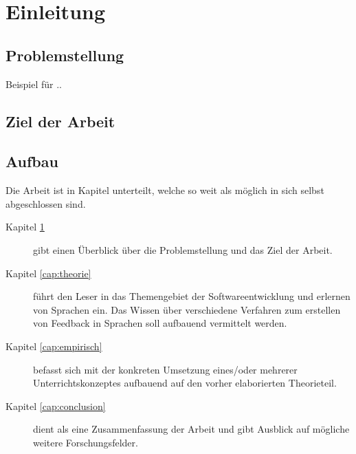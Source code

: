 \chapter{Einleitung}
\label{cap:einleitung}



\section{Problemstellung}

Beispiel für \cite{Akgun07}.. 

\lipsum[2-4]

\section{Ziel der Arbeit}
\lipsum[2-4]




\section{Aufbau}
Die Arbeit ist in Kapitel unterteilt, welche so weit als möglich in sich selbst abgeschlossen sind. 

\begin{description}
\item[Kapitel \ref{cap:einleitung}] gibt einen Überblick über die Problemstellung und das Ziel der Arbeit. 
\item[Kapitel \ref{cap:theorie}] führt den Leser in das Themengebiet der Softwareentwicklung und erlernen von Sprachen ein. Das Wissen über verschiedene Verfahren zum erstellen von Feedback in Sprachen soll aufbauend vermittelt werden.
\item[Kapitel \ref{cap:empirisch}] befasst sich mit der konkreten Umsetzung eines/oder mehrerer Unterrichtskonzeptes aufbauend auf den vorher elaborierten Theorieteil. 
\item[Kapitel \ref{cap:conclusion}] dient als eine Zusammenfassung der Arbeit und gibt Ausblick auf mögliche weitere Forschungsfelder.
\end{description}
